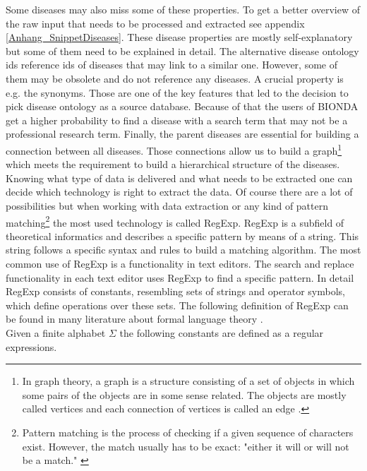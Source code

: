 Some diseases may also miss some of these properties. To get a better overview of the raw input that needs to be processed and extracted see appendix \ref{Anhang_SnippetDiseases}. These disease properties are mostly self-explanatory but some of them need to be explained in detail. The alternative disease ontology ids reference ids of diseases that may link to a similar one. However, some of them may be obsolete and do not reference any diseases. A crucial property is e.g. the synonyms. Those are one of the key features that led to the decision to pick disease ontology as a source database. Because of that the users of \ac{BIONDA} get a higher probability to find a disease with a search term that may not be a professional research term. Finally, the parent diseases are essential for building a connection between all diseases. Those connections allow us to build a graph\footnote{In graph theory, a graph is a structure consisting of a set of objects in which some pairs of the objects are in some sense related. The objects are mostly called vertices and each connection of vertices is called an edge \citep{Trudeau1993}.} which meets the requirement to build a hierarchical structure of the diseases. \\

Knowing what type of data is delivered and what needs to be extracted one can decide which technology is right to extract the data. Of course there are a lot of possibilities but when working with data extraction or any kind of pattern matching\footnote{Pattern matching is the process of checking if a given sequence of characters exist. However, the match usually has to be exact: "either it will or will not be a match." \citep{Hopcroft2007}} the most used technology is called \ac{RegExp}. \ac{RegExp} is a subfield of theoretical informatics and describes a specific pattern by means of a string. This string follows a specific syntax and rules to build a matching algorithm. The most common use of \ac{RegExp} is a functionality in text editors. The search and replace functionality in each text editor uses \ac{RegExp} to find a specific pattern. In detail \ac{RegExp} consists of constants, resembling sets of strings and operator symbols, which define operations over these sets. The following definition of \ac{RegExp} can be found in many literature about formal language theory \citep{Hopcroft2007}. \\

Given a finite alphabet $\Sigma$ the following constants are defined as a regular expressions.

